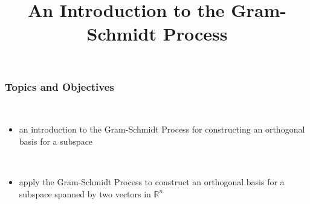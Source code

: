 \title{An Introduction to the Gram-Schmidt Process}
\subtitle{\SubTitleName}
\institute[]{\Course}
\author{\Instructor}
\maketitle   
  



 
\begin{frame}\frametitle{Topics and Objectives}
     \\
    \begin{itemize}
        \item an introduction to the Gram-Schmidt Process for constructing an orthogonal basis for a subspace
    \end{itemize}
    
    \vspace{0.5cm}
    
    \\
    
    
    \begin{itemize}
    \item  apply the Gram-Schmidt Process to construct an orthogonal basis for a subspace spanned by two vectors in $\mathbb R^n$
    
      
    \end{itemize}
    
    \vspace{0.25cm} 
 
\end{frame}



